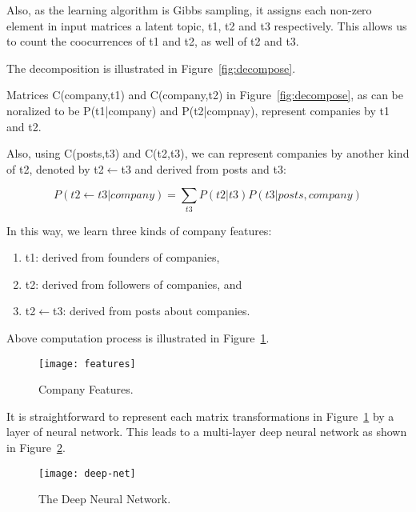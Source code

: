\documentclass{article}
\begin{document}
Also, as the learning algorithm is Gibbs sampling, it assigns each
non-zero element in input matrices a latent topic, t1, t2 and t3
respectively.  This allows us to count the coocurrences of t1 and t2,
as well of t2 and t3.

The decomposition is illustrated in Figure~\ref{fig:decompose}.

Matrices C(company,t1) and C(company,t2) in
Figure~\ref{fig:decompose}, as can be noralized to be P(t1|company)
and P(t2|compnay), represent companies by t1 and t2.

Also, using C(posts,t3) and C(t2,t3), we can represent companies by
another kind of t2, denoted by t2$\leftarrow$t3 and derived from posts
and t3:

\begin{equation}
  \label{eq:1}
  P(t2\leftarrow t3 | company) = \sum_{t3} P(t2|t3) P(t3|posts, company)
\end{equation}

In this way, we learn three kinds of company features:
\begin{enumerate}
\item t1: derived from founders of companies,
\item t2: derived from followers of companies, and
\item t2$\leftarrow$t3: derived from posts about companies.
\end{enumerate}

Above computation process is illustrated in Figure~\ref{fig:features}.

\begin{figure}
  \centering
  \texttt{[image: features]}
  \caption{Company Features.}
  \label{fig:features}
\end{figure}

It is straightforward to represent each matrix transformations in
Figure~\ref{fig:features} by a layer of neural network.  This leads to
a multi-layer deep neural network as shown in
Figure~\ref{fig:deep-net}.

\begin{figure}
  \centering
  \texttt{[image: deep-net]}
  \caption{The Deep Neural Network.}
  \label{fig:deep-net}
\end{figure}
\end{document}
